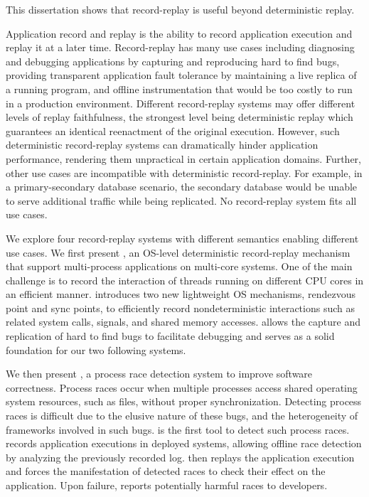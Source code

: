 This dissertation shows that record-replay is useful beyond deterministic replay.

Application record and replay is the ability to record application execution and
replay it at a later time. Record-replay has many use cases including diagnosing and
debugging applications by capturing and reproducing hard to find bugs, providing
transparent application fault tolerance by maintaining a live replica of a running program,
and offline instrumentation that would be too costly to run in a production environment.
Different record-replay systems may offer different levels of replay faithfulness,
the strongest level being deterministic replay which guarantees an identical
reenactment of the original execution. However, such deterministic record-replay systems
can dramatically hinder application performance, rendering them unpractical in
certain application domains. Further, other use cases are incompatible with
deterministic record-replay. For example, in a primary-secondary database scenario,
the secondary database would be unable to serve additional traffic while being
replicated. No record-replay system fits all use cases.

We explore four record-replay systems with different semantics enabling different use cases.
We first present \scribe, an OS-level deterministic record-replay mechanism
that support multi-process applications on multi-core systems. One of the main
challenge is to record the interaction of threads running on different CPU cores
in an efficient manner.
\scribe introduces two new lightweight OS mechanisms, rendezvous point and sync
points, to efficiently record nondeterministic interactions such as related
system calls, signals, and shared memory accesses. \scribe allows the capture
and replication of hard to find bugs to facilitate debugging and serves as a
solid foundation for our two following systems.

We then present \racepro, a process race detection system to improve
software correctness. Process races occur when multiple processes access shared
operating system resources, such as files, without proper synchronization.
Detecting process races is difficult due to the elusive nature of these bugs,
and the heterogeneity of frameworks involved in such bugs.
\racepro is the first tool to detect such process races.
\racepro records application executions in deployed systems, allowing offline
race detection by analyzing the previously recorded log. \racepro then replays
the application execution and forces the manifestation of detected races to check their
effect on the application. Upon failure, \racepro reports potentially harmful
races to developers.

